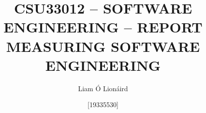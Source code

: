\documentclass[12pt]{article}
\begin{document}
	\title{{\large CSU33012 -- SOFTWARE ENGINEERING -- REPORT}\\\bigskip \textbf{MEASURING SOFTWARE ENGINEERING}}
	\author{Liam \'{O} Lion\'{a}ird \and [19335530]}
	\maketitle
	
	\begin{center}
		\hrulefill
	\end{center}

	
\end{document}
